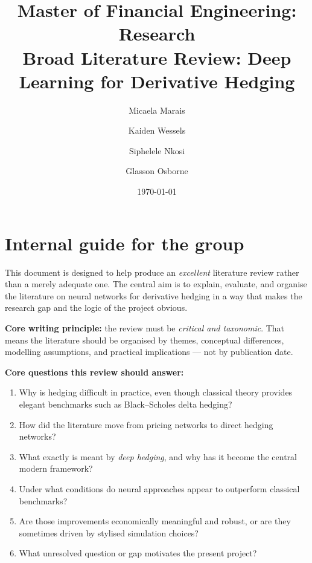 \documentclass[12pt, a4paper]{article}
\title{%
    {\large Master of Financial Engineering: Research}\\[0.5em]
    \textbf{Broad Literature Review: Deep Learning for Derivative Hedging}%
}
\author[1]{Micaela Marais}
\author[1]{Kaiden Wessels}
\author[1]{Siphelele Nkosi}
\author[1]{Glasson Osborne}
\affil[1]{African Institute of Financial Markets and Risk Management}
\date{\today}
\begin{document}

\maketitle



\section*{Internal guide for the group}

This document is designed to help produce an \emph{excellent} literature review rather
than a merely adequate one. The central aim is to explain, evaluate, and organise the
literature on neural networks for derivative hedging in a way that makes the research
gap and the logic of the project obvious.

\textbf{Core writing principle:} the review must be \emph{critical and taxonomic}. That
means the literature should be organised by themes, conceptual differences, modelling
assumptions, and practical implications --- not by publication date.

\textbf{Core questions this review should answer:}
\begin{enumerate}[label=\arabic*.]
    \item Why is hedging difficult in practice, even though classical theory provides
          elegant benchmarks such as Black--Scholes delta hedging?
    \item How did the literature move from pricing networks to direct hedging networks?
    \item What exactly is meant by \emph{deep hedging}, and why has it become the
          central modern framework?
    \item Under what conditions do neural approaches appear to outperform classical
          benchmarks?
    \item Are those improvements economically meaningful and robust, or are they
          sometimes driven by stylised simulation choices?
    \item What unresolved question or gap motivates the present project?
\end{enumerate}
\end{document}
